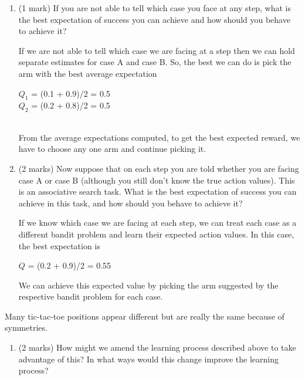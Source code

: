 \documentclass[addpoints,12pt,solution]{exam}
\begin{document}
\begin{questions}
\begin{enumerate}[label=(\alph*)]
    \item (1 mark) If you are not able to tell which case you face at any step, what is the best expectation of success you can achieve and how should you behave to achieve it?
\begin{solution}
If we are not able to tell which case we are facing at a step then we can hold separate estimates for case A and case B. So, the best we can do is pick the arm with the best average expectation 
\begin{center}
$Q_{1}$ = (0.1 + 0.9)/2 = 0.5
\\
$Q_{2}$ = (0.2 + 0.8)/2 = 0.5 
\end{center}
\\
From the average expectations computed, to get the best expected reward, we have to choose any one arm and continue picking it.
\end{solution}
    
    \item (2 marks) Now suppose that on each step you are told whether you are facing case A or case B (although you still don’t know the true action values). This is an associative search task. What is the best expectation of success you can achieve in this task, and how should you behave to achieve it?
\begin{solution}
If we know which case we are facing at each step, we can treat each case as a different bandit problem and learn their expected action values. In this case, the best expectation is
\begin{center}
$Q$ = (0.2 + 0.9)/2 = 0.55
\end{center}
We can achieve this expected value by picking the arm suggested by the respective bandit problem for each case.
\end{solution}
\end{enumerate}
 




\question[5]Many tic-tac-toe positions appear different but are really the same because of symmetries. 
\begin{enumerate}[label=(\alph*)]
    \item (2 marks) How might we amend the learning process described above to take advantage of this? In what ways would this change improve the learning process? 
    
\begin{solution}


\end{solution}
\end{enumerate}
\end{questions}
\end{document}
